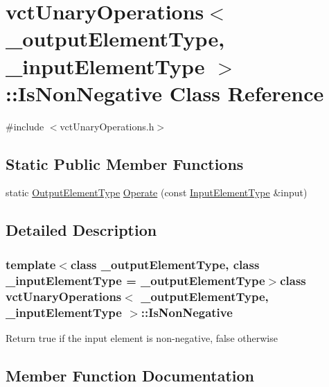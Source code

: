 \hypertarget{classvct_unary_operations_1_1_is_non_negative}{}\section{vct\+Unary\+Operations$<$ \+\_\+output\+Element\+Type, \+\_\+input\+Element\+Type $>$\+:\+:Is\+Non\+Negative Class Reference}
\label{classvct_unary_operations_1_1_is_non_negative}


{\ttfamily \#include $<$vct\+Unary\+Operations.\+h$>$}

\subsection*{Static Public Member Functions}
\begin{DoxyCompactItemize}
\item 
static \hyperlink{classvct_unary_operations_a42306ac3dd20d32c6d6c66ac3fa2e7b9}{Output\+Element\+Type} \hyperlink{classvct_unary_operations_1_1_is_non_negative_a77cb1743165e934914d288a54cd6b633}{Operate} (const \hyperlink{classvct_unary_operations_abf3b77bb7b8abd7ba72a6a45a65696a7}{Input\+Element\+Type} \&input)
\end{DoxyCompactItemize}


\subsection{Detailed Description}
\subsubsection*{template$<$class \+\_\+output\+Element\+Type, class \+\_\+input\+Element\+Type = \+\_\+output\+Element\+Type$>$class vct\+Unary\+Operations$<$ \+\_\+output\+Element\+Type, \+\_\+input\+Element\+Type $>$\+::\+Is\+Non\+Negative}

Return true if the input element is non-\/negative, false otherwise 

\subsection{Member Function Documentation}
\hypertarget{classvct_unary_operations_1_1_is_non_negative_a77cb1743165e934914d288a54cd6b633}{}
